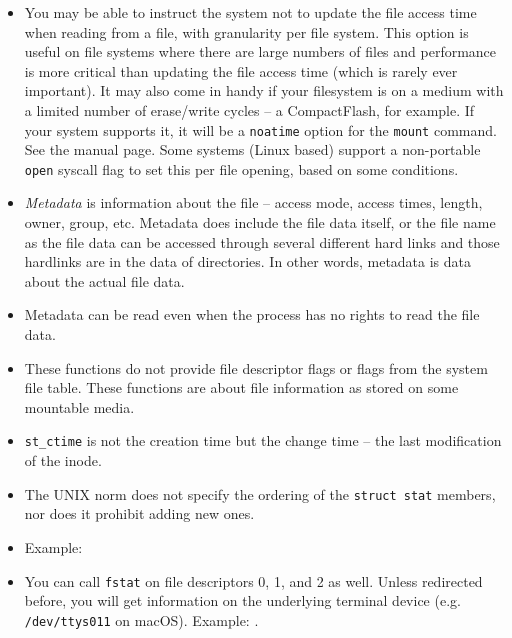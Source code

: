 \begin{itemize}
\item You may be able to instruct the system not to update the file access time
when reading from a file, with granularity per file system.  This option is
useful on file systems where there are large numbers of files and performance is
more critical than updating the file access time (which is rarely ever
important).  It may also come in handy if your filesystem is on a medium with a
limited number of erase/write cycles -- a CompactFlash, for example.  If your
system supports it, it will be a \texttt{noatime} option for the \texttt{mount}
command.  See the manual page. Some systems (Linux based) support a non-portable
\texttt{open} syscall flag to set this per file opening, based on some
conditions.
\item \emph{Metadata} is information about the file -- access mode, access
times, length, owner, group, etc.  Metadata does  include the file
data itself, or the file name as the file data can be accessed through
several different hard links and those hardlinks are in the data of directories.
In other words, metadata is data about the actual file data.
\item Metadata can be read even when the process has no rights to read the file
data.
\item These functions do not provide file descriptor flags or flags from the
system file table. These functions are about file information as stored on some
mountable media.
\item \texttt{st\_ctime} is not the creation time but the change time -- the
last modification of the inode.
\item The UNIX norm does not specify the ordering of the \texttt{struct stat}
members, nor does it prohibit adding new ones.
\item {} Example: 
\item You can call \texttt{fstat} on file descriptors 0, 1, and 2 as well.  Unless
redirected before, you will get information on the underlying terminal device
(e.g. \texttt{/dev/ttys011} on macOS).  Example: .
\end{itemize}




